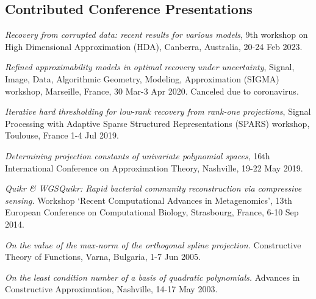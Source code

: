 \documentclass[11pt]{article}
\begin{document}
\subsection{Contributed Conference Presentations}
\bitemize
\item {\sl Recovery from corrupted data: recent results for various models},
9th workshop on High Dimensional Approximation (HDA),  Canberra, Australia,  20-24 Feb 2023.
\item {\sl Refined approximability models in optimal recovery under uncertainty},
Signal, Image, Data, Algorithmic Geometry, Modeling, Approximation (SIGMA) workshop,
Marseille, France, 30 Mar-3 Apr 2020. {\small Canceled due to coronavirus.}
\item {\sl Iterative hard thresholding for low-rank recovery from rank-one projections}, Signal Processing with Adaptive Sparse Structured Representations (SPARS) workshop, Toulouse, France 1-4 Jul 2019.
\item {\sl Determining projection constants of univariate polynomial spaces},
16th International Conference on Approximation Theory, Nashville, 19-22 May 2019.
\item {\sl Quikr \& WGSQuikr: Rapid bacterial community reconstruction via compressive sensing.} 
\mbox{Workshop} `Recent Computational Advances in Metagenomics',
13th European Conference on Computational \mbox{Biology},
Strasbourg, France, 6-10 Sep 2014.
\item {\sl On the value of the max-norm of the orthogonal spline projection.} Constructive Theory of Functions, Varna, Bulgaria, 1-7 Jun 2005.
\item {\sl On the least condition number of a basis of quadratic polynomials.} Advances in Constructive Approximation, Nashville, 14-17 May 2003.
\eitemize
\end{document}
